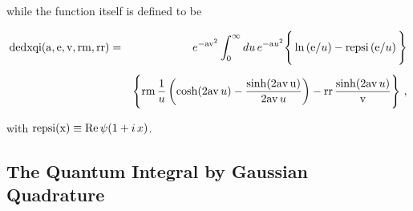 \documentclass[preprint,12pt,eqsecnum,nofootinbib,amsmath,amssymb]{revtex4}
\begin{document}
\vskip0.5cm
\noindent
while the function itself is defined to be

\vbox{
\begin{eqnarray}
   {\rm dedxqi}({\rm a},{\rm e},{\rm v},{\rm rm},{\rm rr})    
  &=& e^{- {\rm a} {\rm v}^2}
  \int_0^\infty du\, e^{-{\rm a} u^2}\Bigg\{\ln\left({\rm e}/u\right) - 
  {\rm repsi}\left({\rm e}/u\right) \Bigg\}
\nonumber\\[5pt]
  && 
  \Bigg\{ 
  {\rm rm} \, \frac{1}{u} 
  \left(\cosh(2{\rm a} {\rm v}\,u) -
  {\sinh(2 {\rm a} {\rm v\, u}) \over 2 {\rm a} {\rm v}\, u} 
  \right)  -
  {\rm rr}\, \frac{\sinh(2 {\rm a} {\rm v}\, u)}{{\rm v}} 
  \Bigg\} \ ,
\end{eqnarray}
}

\noindent
with ${\rm repsi(x)} \equiv {\rm Re}\,\psi(1 + i\, x)$. 


\subsection{The Quantum Integral by Gaussian Quadrature} 
\end{document}
